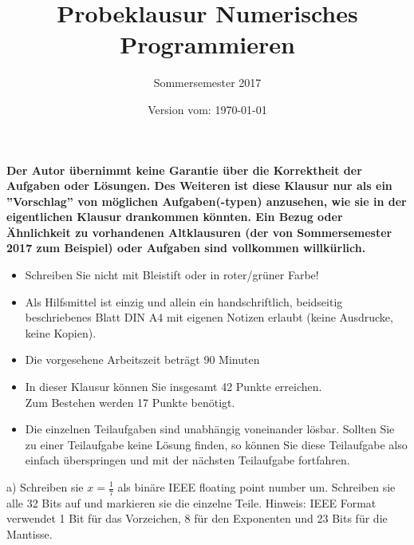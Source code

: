 \documentclass{scrartcl}
\begin{document}
\title{Probeklausur Numerisches Programmieren}
\subtitle{Sommersemester 2017}
\author{\npauthor{}}
\date{Version vom: \today}
\maketitle

\textbf{Der Autor übernimmt keine Garantie über die Korrektheit der Aufgaben oder Lösungen. \n Des Weiteren ist diese Klausur nur als ein ''Vorschlag'' von möglichen Aufgaben(-typen) anzusehen, wie sie in der eigentlichen Klausur drankommen könnten. Ein Bezug oder Ähnlichkeit zu vorhandenen Altklausuren (der von Sommersemester 2017 zum Beispiel) oder Aufgaben sind vollkommen willkürlich.}
\sbreak

\begin{itemize}
	\item Schreiben Sie nicht mit Bleistift oder in roter/grüner Farbe!
	\item Als Hilfsmittel ist einzig und allein ein handschriftlich, beidseitig beschriebenes Blatt DIN A4 mit eigenen Notizen erlaubt (keine Ausdrucke, keine Kopien).
	\item Die vorgesehene Arbeitszeit beträgt 90 Minuten
	\item In dieser Klausur können Sie insgesamt 42 Punkte erreichen. \\Zum Bestehen werden 17 Punkte benötigt.
	\item Die einzelnen Teilaufgaben sind unabhängig voneinander lösbar.
	Sollten Sie zu einer Teilaufgabe keine Lösung finden, so können Sie diese Teilaufgabe also einfach überspringen und mit der nächsten Teilaufgabe fortfahren.
\end{itemize}


	a) 
	Schreiben sie $x = \frac{1}{7}$ als binäre IEEE floating point number um. Schreiben sie alle 32 Bits auf und markieren sie die einzelne Teile.
	\n
	Hinweis: IEEE Format verwendet 1 Bit für das Vorzeichen, 8 für den Exponenten und 23 Bits für die Mantisse. 
	\lbreak \lbreak \lbreak \lbreak \lbreak
	\\
\end{document}

